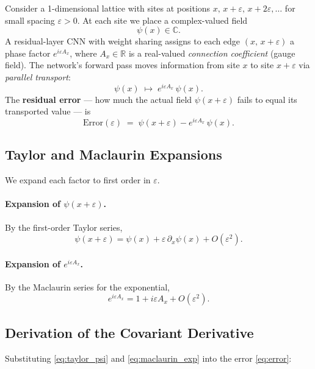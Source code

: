 \documentclass[12pt, a4paper]{article}
\theoremstyle{plain}
\theoremstyle{definition}
\theoremstyle{remark}
\newcommand{\R}{\mathbb{R}}
\newcommand{\C}{\mathbb{C}}
\newcommand{\eps}{\varepsilon}
\newcommand{\psifield}{\psi}
\begin{document}
Consider a 1-dimensional lattice with sites at positions $x,\, x{+}\eps,\, x{+}2\eps,\ldots$ for small spacing $\eps > 0$.  At each site we place a complex-valued field
\[
  \psifield(x) \in \C.
\]
A residual-layer CNN with weight sharing assigns to each edge $(x,\, x{+}\eps)$ a phase factor $e^{i\eps A_x}$, where $A_x \in \R$ is a real-valued \emph{connection coefficient} (gauge field).  The network's forward pass moves information from site $x$ to site $x{+}\eps$ via \emph{parallel transport}:
\[
  \psifield(x) \;\longmapsto\; e^{i\eps A_x}\,\psifield(x).
\]
The \textbf{residual error} — how much the actual field $\psifield(x{+}\eps)$ fails to equal its transported value — is
\begin{equation}
  \mathrm{Error}(\eps) \;=\; \psifield(x{+}\eps) - e^{i\eps A_x}\,\psifield(x).
  \label{eq:error}
\end{equation}

\subsection{Taylor and Maclaurin Expansions}

We expand each factor to first order in $\eps$.

\paragraph{Expansion of $\psifield(x+\eps)$.}  By the first-order Taylor series,
\begin{equation}
  \psifield(x+\eps) = \psifield(x) + \eps\,\partial_x\psifield(x) + O(\eps^2).
  \label{eq:taylor_psi}
\end{equation}

\paragraph{Expansion of $e^{i\eps A_x}$.}  By the Maclaurin series for the exponential,
\begin{equation}
  e^{i\eps A_x} = 1 + i\eps A_x + O(\eps^2).
  \label{eq:maclaurin_exp}
\end{equation}

\subsection{Derivation of the Covariant Derivative}

Substituting \eqref{eq:taylor_psi} and \eqref{eq:maclaurin_exp} into the error \eqref{eq:error}:
\end{document}
